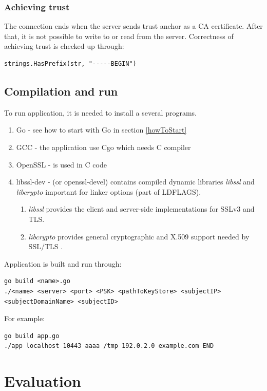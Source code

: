 \documentclass[
  digital, %
  notable,   %
  lof,     %
  lot,     %
]{fithesis3}
\begin{document}
\subsection{Achieving trust}
The connection ends when the server sends trust anchor as a CA certificate. After that, it is not 
possible to write to or read from the server. Correctness of achieving trust is checked up 
through:
\begin{lstlisting}
strings.HasPrefix(str, "-----BEGIN")
\end{lstlisting}

\section{Compilation and run}
To run application, it is needed to install a several programs.
\begin{enumerate}
\item Go - see how to start with Go in section \ref{howToStart}
\item GCC - the application use Cgo which needs C compiler
\item OpenSSL - is used in C code
\item libssl-dev - (or openssl-devel) contains compiled dynamic libraries \textit{libssl} and \textit{libcrypto} important for linker options (part of LDFLAGS). 
\begin{enumerate}
  \item \textit{libssl} provides the client and server-side implementations for SSLv3 and TLS.
  \item \textit{libcrypto} provides general cryptographic and X.509 support needed by SSL/TLS \cite{opensslgit}.
\end{enumerate}
\end{enumerate}

Application is built and run through:
\begin{lstlisting}
go build <name>.go
./<name> <server> <port> <PSK> <pathToKeyStore> <subjectIP> <subjectDomainName> <subjectID>
\end{lstlisting}

For example:
\begin{lstlisting}
go build app.go
./app localhost 10443 aaaa /tmp 192.0.2.0 example.com END
\end{lstlisting}

\nocite{linux-man}
\nocite{foundation}

\chapter{Evaluation}
\end{document}
